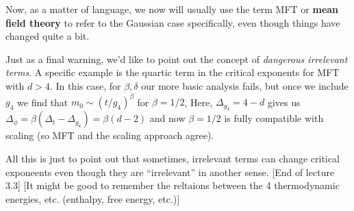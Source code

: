 \documentclass{article}
\theoremstyle{definition}
\begin{document}
Now, as a matter of language, we now will usually use the term MFT or
\textbf{mean field theory} to refer to the Gaussian case specifically, even
though things have changed quite a bit.

Just as a final warning, we'd like to point out the concept of \textit{dangerous
irrelevant terms}. A specific example is the quartic term in the critical
exponents for MFT with $d > 4$. In this case, for $\beta, \delta$ our more basic
analysis fails, but once we include $g_4$ we find that $m_0 \sim (t /
g_4)^\beta$ for $\beta = 1/2$, Here, $\Delta_{g_4} = 4 - d$ gives us
$\Delta_\phi = \beta(\Delta_t - \Delta_{g_4}) = \beta (d - 2)$ and now $\beta =
1/2$ is fully compatible with scaling (so MFT and the scaling approach agree).

All this is just to point out that sometimes, irrelevant terms can change
critical exponeents even though they are ``irrelevant'' in another sense. [End
of lecture 3.3] [It might be good to remember the reltaions between the 4
thermodynamic energies, etc. (enthalpy, free energy, etc.)]
\end{document}
